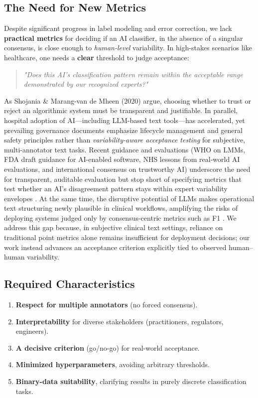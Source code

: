 \documentclass[12pt]{article}
\begin{document}
\subsection{The Need for New Metrics}
Despite significant progress in label modeling and error correction, we lack \textbf{practical metrics} for deciding if an AI classifier, in the absence of a singular consensus, is close enough to \textit{human-level} variability. In high-stakes scenarios like healthcare, one needs a \textbf{clear} threshold to judge acceptance:
\begin{quote}
\emph{"Does this AI’s classification pattern remain within the acceptable range demonstrated by our recognized experts?"}
\end{quote}
As Shojania \& Marang-van de Mheen (2020) argue, choosing whether to trust or reject an algorithmic system must be transparent and justifiable.
In parallel, hospital adoption of AI—including LLM-based text tools—has accelerated, yet prevailing governance documents emphasize lifecycle management and general safety principles rather than \emph{variability-aware acceptance testing} for subjective, multi-annotator text tasks. Recent guidance and evaluations (WHO on LMMs, FDA draft guidance for AI-enabled software, NHS lessons from real-world AI evaluations, and international consensus on trustworthy AI) underscore the need for transparent, auditable evaluation but stop short of specifying metrics that test whether an AI’s disagreement pattern stays within expert variability envelopes \cite{who2025lmm,fda2025draft,nhs2024eval,futureai2025}. At the same time, the disruptive potential of LLMs makes operational text structuring newly plausible in clinical workflows, amplifying the risks of deploying systems judged only by consensus-centric metrics such as F1 \cite{tam2024humanEval,singhal2023clinKnowledge,reddy2024genAI}. We address this gap because, in subjective clinical text settings, reliance on traditional point metrics alone remains insufficient for deployment decisions; our work instead advances an acceptance criterion explicitly tied to observed human–human variability.



\subsection{Required Characteristics}
\begin{enumerate}
\item \textbf{Respect for multiple annotators} (no forced consensus).
\item \textbf{Interpretability} for diverse stakeholders (practitioners, regulators, engineers).
\item \textbf{A decisive criterion} (go/no-go) for real-world acceptance.
\item \textbf{Minimized hyperparameters}, avoiding arbitrary thresholds.
\item \textbf{Binary-data suitability}, clarifying results in purely discrete classification tasks.
\end{enumerate}
\end{document}
